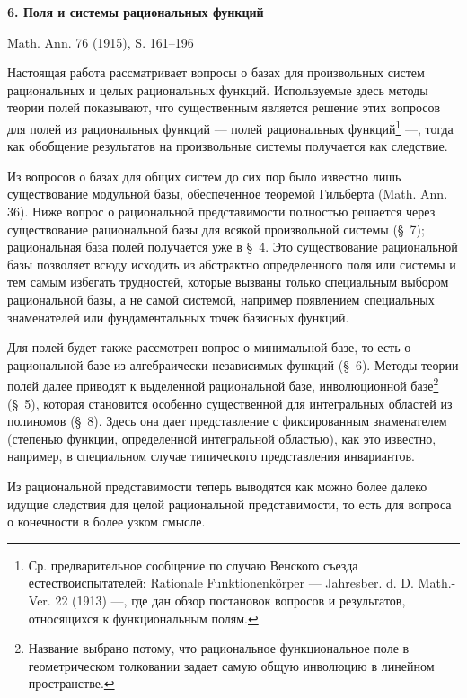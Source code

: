\documentclass[11pt]{article}
\begin{document}
\begin{center}
{\Large\bfseries 6. Поля и системы рациональных функций}\par
\vspace{1.2em}
Math. Ann. 76 (1915), S. 161--196
\end{center}

\vspace{2em}

Настоящая работа рассматривает вопросы о базах для произвольных систем рациональных и целых рациональных функций. Используемые здесь методы теории полей показывают, что существенным является решение этих вопросов для полей из рациональных функций --- полей рациональных функций\footnote{Ср. предварительное сообщение по случаю Венского съезда естествоиспытателей: Rationale Funktionenkörper --- Jahresber. d. D. Math.-Ver. 22 (1913) ---, где дан обзор постановок вопросов и результатов, относящихся к функциональным полям.} ---, тогда как обобщение результатов на произвольные системы получается как следствие.

Из вопросов о базах для общих систем до сих пор было известно лишь существование модульной базы, обеспеченное теоремой Гильберта (Math. Ann. 36). Ниже вопрос о рациональной представимости полностью решается через существование рациональной базы для всякой произвольной системы (\S\ 7); рациональная база полей получается уже в \S\ 4. Это существование рациональной базы позволяет всюду исходить из абстрактно определенного поля или системы и тем самым избегать трудностей, которые вызваны только специальным выбором рациональной базы, а не самой системой, например появлением специальных знаменателей или фундаментальных точек базисных функций.

Для полей будет также рассмотрен вопрос о минимальной базе, то есть о рациональной базе из алгебраически независимых функций (\S\ 6). Методы теории полей далее приводят к выделенной рациональной базе, инволюционной базе\footnote{Название выбрано потому, что рациональное функциональное поле в геометрическом толковании задает самую общую инволюцию в линейном пространстве.} (\S\ 5), которая становится особенно существенной для интегральных областей из полиномов (\S\ 8). Здесь она дает представление с фиксированным знаменателем (степенью функции, определенной интегральной областью), как это известно, например, в специальном случае типического представления инвариантов.

Из рациональной представимости теперь выводятся как можно более далеко идущие следствия для целой рациональной представимости, то есть для вопроса о конечности в более узком смысле.
\end{document}
